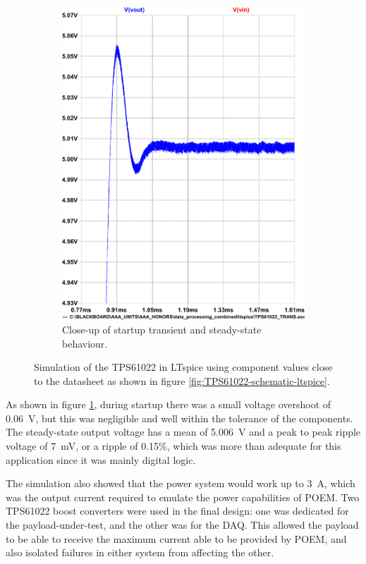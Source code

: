 \documentclass{report}
\begin{document}
\begin{figure}[H]
\begin{subfigure}{0.495\textwidth}
    \includegraphics[width=\linewidth]{images/TPS61022-simulation-plot-overshoot.pdf}
    \caption{Close-up of startup transient and steady-state behaviour.}
  \end{subfigure}
  \caption{Simulation of the TPS61022 in LTspice using component values close to the datasheet as shown in figure \ref{fig:TPS61022-schematic-ltspice}.}
  \label{fig:TPS61022-simulation-ltspice}
\end{figure}

As shown in figure \ref{fig:TPS61022-simulation-ltspice}, during startup there was a small voltage overshoot of \SI{0.06}{\volt}, but this was negligible and well within the tolerance of the components. The steady-state output voltage has a mean of \SI{5.006}{\volt} and a peak to peak ripple voltage of \SI{7}{\milli\volt}, or a ripple of 0.15\%, which was more than adequate for this application since it was mainly digital logic.

The simulation also showed that the power system would work up to \SI{3}{\ampere}, which was the output current required to emulate the power capabilities of POEM. Two TPS61022 boost converters were used in the final design: one was  dedicated for the payload-under-test, and the other was for the DAQ. This allowed the payload to be able to receive the maximum current able to be provided by POEM, and also isolated failures in either system from affecting the other.
\end{document}
